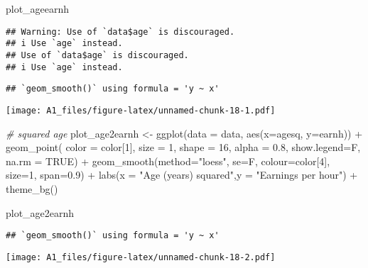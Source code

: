 \documentclass[
]{article}
\newenvironment{Shaded}{\begin{snugshade}}{\end{snugshade}}
\newcommand{\AttributeTok}[1]{\textcolor[rgb]{0.77,0.63,0.00}{#1}}
\newcommand{\CommentTok}[1]{\textcolor[rgb]{0.56,0.35,0.01}{\textit{#1}}}
\newcommand{\ConstantTok}[1]{\textcolor[rgb]{0.00,0.00,0.00}{#1}}
\newcommand{\DecValTok}[1]{\textcolor[rgb]{0.00,0.00,0.81}{#1}}
\newcommand{\FloatTok}[1]{\textcolor[rgb]{0.00,0.00,0.81}{#1}}
\newcommand{\FunctionTok}[1]{\textcolor[rgb]{0.00,0.00,0.00}{#1}}
\newcommand{\NormalTok}[1]{#1}
\newcommand{\OtherTok}[1]{\textcolor[rgb]{0.56,0.35,0.01}{#1}}
\newcommand{\SpecialCharTok}[1]{\textcolor[rgb]{0.00,0.00,0.00}{#1}}
\newcommand{\StringTok}[1]{\textcolor[rgb]{0.31,0.60,0.02}{#1}}
\begin{document}
\begin{Shaded}
\begin{Highlighting}[]
\NormalTok{plot\_ageearnh}
\end{Highlighting}
\end{Shaded}

\begin{verbatim}
## Warning: Use of `data$age` is discouraged.
## i Use `age` instead.
## Use of `data$age` is discouraged.
## i Use `age` instead.
\end{verbatim}

\begin{verbatim}
## `geom_smooth()` using formula = 'y ~ x'
\end{verbatim}

\texttt{[image: A1\_files/figure-latex/unnamed-chunk-18-1.pdf]}

\begin{Shaded}
\begin{Highlighting}[]
\CommentTok{\# squared age}
\NormalTok{plot\_age2earnh }\OtherTok{\textless{}{-}} \FunctionTok{ggplot}\NormalTok{(}\AttributeTok{data =}\NormalTok{ data, }\FunctionTok{aes}\NormalTok{(}\AttributeTok{x=}\NormalTok{agesq, }\AttributeTok{y=}\NormalTok{earnh)) }\SpecialCharTok{+}
  \FunctionTok{geom\_point}\NormalTok{( }\AttributeTok{color =}\NormalTok{ color[}\DecValTok{1}\NormalTok{], }\AttributeTok{size =} \DecValTok{1}\NormalTok{,  }\AttributeTok{shape =} \DecValTok{16}\NormalTok{, }\AttributeTok{alpha =} \FloatTok{0.8}\NormalTok{, }\AttributeTok{show.legend=}\NormalTok{F, }
              \AttributeTok{na.rm =} \ConstantTok{TRUE}\NormalTok{) }\SpecialCharTok{+} 
  \FunctionTok{geom\_smooth}\NormalTok{(}\AttributeTok{method=}\StringTok{"loess"}\NormalTok{, }\AttributeTok{se=}\NormalTok{F, }\AttributeTok{colour=}\NormalTok{color[}\DecValTok{4}\NormalTok{], }\AttributeTok{size=}\DecValTok{1}\NormalTok{, }\AttributeTok{span=}\FloatTok{0.9}\NormalTok{) }\SpecialCharTok{+}
  \FunctionTok{labs}\NormalTok{(}\AttributeTok{x =} \StringTok{"Age (years) squared"}\NormalTok{,}\AttributeTok{y =} \StringTok{"Earnings per hour"}\NormalTok{) }\SpecialCharTok{+}
  \FunctionTok{theme\_bg}\NormalTok{()}

\NormalTok{plot\_age2earnh}
\end{Highlighting}
\end{Shaded}

\begin{verbatim}
## `geom_smooth()` using formula = 'y ~ x'
\end{verbatim}

\texttt{[image: A1\_files/figure-latex/unnamed-chunk-18-2.pdf]}
\end{document}
